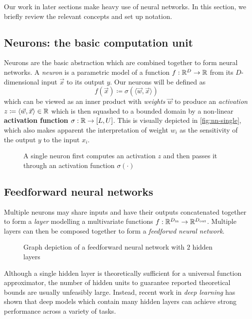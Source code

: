 Our work in later sections make heavy use of neural networks. In this section,
we briefly review the relevant concepts and set up notation.

\subsection{Neurons: the basic computation unit}

Neurons are the basic abstraction which are combined together to form
neural networks. A \emph{neuron} is a parametric model of a function $f : \mathbb{R}^D \to
\mathbb{R}$ from its $D$-dimensional input $\vec{x}$ to its output $y$. Our neurons will be
defined as
\begin{equation}
    f(\vec{x}) \coloneqq \sigma( \langle \vec{w}, \vec{x} \rangle)
\end{equation}
which can be viewed as an inner product with \emph{weights} $\vec{w}$ to
produce an \emph{activation} $z \coloneqq \langle \vec{w}, \vec{x} \rangle
\in \mathbb{R}$ which is then squashed to a bounded domain by a non-linear
\textbf{activation function} $\sigma : \mathbb{R} \to [L, U]$. This is visually
depicted in \autoref{fig:nn-single}, which also makes apparent the
interpretation of weight $w_i$ as the sensitivity of the output $y$ to the
input $x_i$.

\begin{figure}[htpb]
    \centering
    
    \caption{A single neuron first computes an activation $z$ and then passes it through
    an activation function $\sigma(\cdot)$}
    \label{fig:nn-single}
\end{figure}

\subsection{Feedforward neural networks}

Multiple neurons may share inputs and have their outputs concatenated together
to form a \emph{layer} modelling a multivariate functions $f :
\mathbb{R}^{D_\text{in}} \to \mathbb{R}^{D_\text{out}}$. Multiple layers can then
be composed together to form a \emph{feedforwd neural network}.

\begin{figure}[htpb]
    \centering
    
    \caption{Graph depiction of a feedforward neural network with $2$ hidden layers}
    \label{fig:nn-ffw}
\end{figure}

Although a single hidden layer is theoretically sufficient for a universal
function approximator\cite{Cybenko1993}, the number of hidden units to
guarantee reported theoretical bounds are usually unfeasibly large. Instead,
recent work in \emph{deep learning} has shown that deep models which contain
many hidden layers can achieve strong performance across a variety of
tasks\cite{Bengio2011}.

